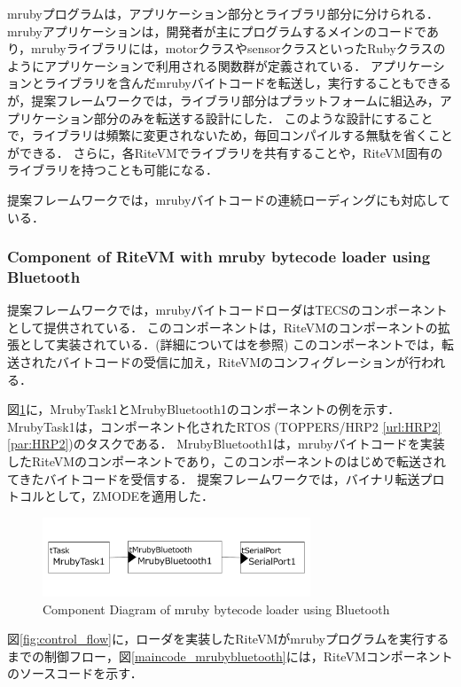 \documentclass[submit]{ipsj_v2/UTF8/ipsj}
\begin{document}
mrubyプログラムは，アプリケーション部分とライブラリ部分に分けられる．
mrubyアプリケーションは，開発者が主にプログラムするメインのコードであり，mrubyライブラリには，motorクラスやsensorクラスといったRubyクラスのようにアプリケーションで利用される関数群が定義されている．
アプリケーションとライブラリを含んだmrubyバイトコードを転送し，実行することもできるが，提案フレームワークでは，ライブラリ部分はプラットフォームに組込み，アプリケーション部分のみを転送する設計にした．
このような設計にすることで，ライブラリは頻繁に変更されないため，毎回コンパイルする無駄を省くことができる．
さらに，各RiteVMでライブラリを共有することや，RiteVM固有のライブラリを持つことも可能になる．

提案フレームワークでは，mrubyバイトコードの連続ローディングにも対応している．

\subsubsection{Component of RiteVM with mruby bytecode loader using Bluetooth}
提案フレームワークでは，mrubyバイトコードローダはTECSのコンポーネントとして提供されている．
このコンポーネントは，RiteVMのコンポーネントの拡張として実装されている．(詳細については\cite{par:mrubyonTECS}を参照)
このコンポーネントでは，転送されたバイトコードの受信に加え，RiteVMのコンフィグレーションが行われる．

図\ref{fig:component_bluetooth}に，MrubyTask1とMrubyBluetooth1のコンポーネントの例を示す．
MrubyTask1は，コンポーネント化されたRTOS (TOPPERS/HRP2 \ref{url:HRP2}\ref{par:HRP2})のタスクである．
MrubyBluetooth1は，mrubyバイトコードを実装したRiteVMのコンポーネントであり，このコンポーネントのはじめで転送されてきたバイトコードを受信する．
提案フレームワークでは，バイナリ転送プロトコルとして，ZMODEを適用した．

\begin{figure}[t]
    \centering
    \includegraphics[width=8cm,clip]{../EMSOFT2016/figure/component_bluetooth.pdf}
    \caption{Component Diagram of mruby bytecode loader using Bluetooth}
    \label{fig:component_bluetooth}
\end{figure}

図\ref{fig:control_flow}に，ローダを実装したRiteVMがmrubyプログラムを実行するまでの制御フロー，図\ref{maincode_mrubybluetooth}には，RiteVMコンポーネントのソースコードを示す．
\end{document}
